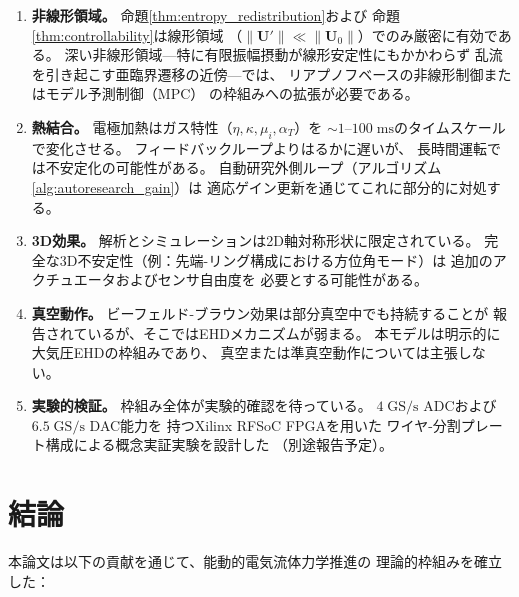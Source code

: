 \documentclass[12pt,twocolumn]{ltjsarticle}
\newcommand{\uu}{\mathbf{U}}
\begin{document}
\begin{enumerate}
  \item \textbf{非線形領域。}
    命題\ref{thm:entropy_redistribution}および
    命題\ref{thm:controllability}は線形領域
    （$\|\uu'\| \ll \|\uu_0\|$）でのみ厳密に有効である。
    深い非線形領域---特に有限振幅摂動が線形安定性にもかかわらず
    乱流を引き起こす亜臨界遷移の近傍---では、
    リアプノフベースの非線形制御またはモデル予測制御（MPC）
    の枠組みへの拡張が必要である。

  \item \textbf{熱結合。}
    電極加熱はガス特性（$\eta, \kappa, \mu_i, \alpha_T$）を
    $\sim 1$--$100\;\mathrm{ms}$のタイムスケールで変化させる。
    フィードバックループよりはるかに遅いが、
    長時間運転では不安定化の可能性がある。
    自動研究外側ループ（アルゴリズム\ref{alg:autoresearch_gain}）は
    適応ゲイン更新を通じてこれに部分的に対処する。

  \item \textbf{3D効果。}
    解析とシミュレーションは2D軸対称形状に限定されている。
    完全な3D不安定性（例：先端-リング構成における方位角モード）は
    追加のアクチュエータおよびセンサ自由度を
    必要とする可能性がある。

  \item \textbf{真空動作。}
    ビーフェルド-ブラウン効果は部分真空中でも持続することが
    報告されているが、そこではEHDメカニズムが弱まる。
    本モデルは明示的に大気圧EHDの枠組みであり、
    真空または準真空動作については主張しない。

  \item \textbf{実験的検証。}
    枠組み全体が実験的確認を待っている。
    $4\;\mathrm{GS/s}$ ADCおよび$6.5\;\mathrm{GS/s}$ DAC能力を
    持つXilinx RFSoC FPGAを用いた
    ワイヤ-分割プレート構成による概念実証実験を設計した
    （別途報告予定）。
\end{enumerate}

\section{結論}
\label{sec:conclusion}

本論文は以下の貢献を通じて、能動的電気流体力学推進の
理論的枠組みを確立した：
\end{document}
